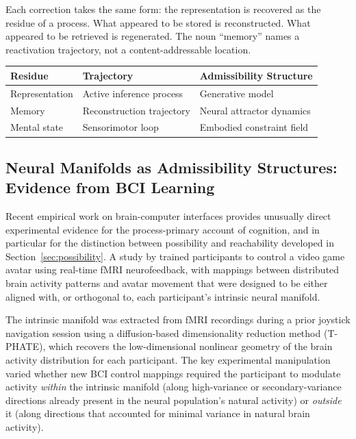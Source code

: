 \documentclass[12pt, a4paper]{article}
\theoremstyle{plain}
\theoremstyle{definition}
\theoremstyle{remark}
\begin{document}
Each correction takes the same form: the representation is recovered as the
residue of a process. What appeared to be stored is reconstructed. What
appeared to be retrieved is regenerated. The noun ``memory'' names a
reactivation trajectory, not a content-addressable location.

\begin{center}
\begin{tabular}{lll}
\toprule
\textbf{Residue} & \textbf{Trajectory} & \textbf{Admissibility Structure} \\
\midrule
Representation & Active inference process & Generative model \\
Memory & Reconstruction trajectory & Neural attractor dynamics \\
Mental state & Sensorimotor loop & Embodied constraint field \\
\bottomrule
\end{tabular}
\end{center}

\subsection{Neural Manifolds as Admissibility Structures: Evidence from BCI Learning}

Recent empirical work on brain-computer interfaces provides unusually
direct experimental evidence for the process-primary account of cognition,
and in particular for the distinction between possibility and reachability
developed in Section~\ref{sec:possibility}. A study by \citet{busch2026}
trained participants to control a video game avatar using real-time fMRI
neurofeedback, with mappings between distributed brain activity patterns
and avatar movement that were designed to be either aligned with, or
orthogonal to, each participant's intrinsic neural manifold.

The intrinsic manifold was extracted from fMRI recordings during a
prior joystick navigation session using a diffusion-based dimensionality
reduction method (T-PHATE), which recovers the low-dimensional nonlinear
geometry of the brain activity distribution for each participant. The key
experimental manipulation varied whether new BCI control mappings required
the participant to modulate activity \emph{within} the intrinsic manifold
(along high-variance or secondary-variance directions already present in
the neural population's natural activity) or \emph{outside} it (along
directions that accounted for minimal variance in natural brain activity).
\end{document}
